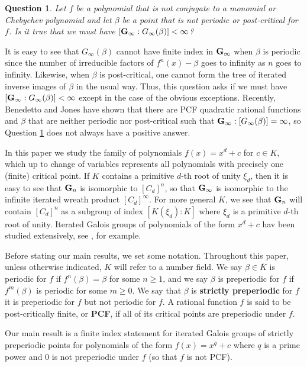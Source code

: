 \documentclass[11pt]{amsart}
\newtheorem{question}[thm]{Question}
\theoremstyle{definition}
\theoremstyle{definition}
\numberwithin{thm}{section}
\numberwithin{equation}{thm}
\newcommand{\Kbar}{\ensuremath {\overline K}}
\begin{document}
\begin{question}\label{qf}
  Let $f$ be a polynomial that is not conjugate to a monomial or
  Chebychev polynomial and let $\beta$ be a point that is not periodic
  or post-critical for $f$.  Is it true that we must have
  $[{\bf G}_\infty: G_\infty(\beta)] < \infty$?
\end{question}

It is easy to see that $G_\infty(\beta)$ cannot have finite index in
${\bf G}_\infty$ when $\beta$ is periodic since the number of
irreducible factors of $f^n(x) - \beta$ goes to infinity as $n$ goes
to infinity.  Likewise, when $\beta$ is post-critical, one cannot form
the tree of iterated inverse images of $\beta$ in the usual way.
Thus, this question asks if we must have
$[{\bf G}_\infty: G_\infty(\beta)] < \infty$ except in the case of the
obvious exceptions.  Recently, Benedetto and Jones \cite{BJ25} have shown that
there are PCF quadratic rational functions and $\beta$ that are
neither periodic nor post-critical such that ${\bf G}_\infty:
[G_\infty(\beta)] = \infty$, so Question \ref{qf} does not always have
a positive answer.  

In this paper we study the family of polynomials $f(x)=x^d+c$ for
$c\in K$, which up to change of variables represents all polynomials
with precisely one (finite) critical point.  If $K$ contains a
primitive $d$-th root of unity $\xi_d$, then it is easy to see that
${\bf G}_n$ is isomorphic to $[C_d]^n$, so that ${\bf G}_\infty$ is
isomorphic to the infinite iterated wreath product $[C_d]^\infty$. For
more general $K$, we see that ${\bf G}_n$ will contain $[C_d]^n$ as a
subgroup of index $[K(\xi_d): K]$ where $\xi_d$ is a primitive $d$-th
root of unity.  Iterated Galois groups of polynomials of the form $x^d
+ c$ hav been studied extensively, see \cite{RafeM, RafeD, RafeK}, for
example.  


Before stating our main results, we set some notation. Throughout
this paper, unless otherwise indicated, $K$ will refer to a number
field. We say $\beta\in \Kbar$ is periodic for $f$ if
$f^n(\beta)=\beta$ for some $n\geq 1$, and we say $\beta$ is
preperiodic for $f$ if $f^m(\beta)$ is periodic for some $m \ge
0$. We say that $\beta$ is {\bf strictly preperiodic} for $f$ it is
preperiodic for $f$ but not periodic for $f$.  A rational function $f$
is said to be post-critically finite, or {\bf PCF},  if all of its critical points are
preperiodic under $f$. 

Our main result is a finite index statement for iterated Galois groups
of strictly preperiodic points for polynomials of the form
$f(x) = x^q + c$ where $q$ is a prime power and 0 is not preperiodic
under $f$ (so that $f$ is not PCF).  
\end{document}
